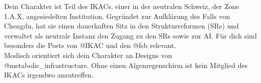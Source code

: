 Dein Charakter ist Teil des IKACs, einer in der neutralen Schweiz, der Zone
1.A.X, angesiedelten Institution. Gegründet zur Aufklärung des Falls von Chengdu,
hat sie einen dauerhaften Sitz in den Strukturreformen (SRs) und verwaltet als
neutrale Instanz den Zugang zu den SRs sowie zur AI. Für dich sind besonders die
Posts von @IKAC und den @fsb relevant.\\ 
Modisch orientiert sich dein Charakter an Designs von
@metabolic\_infrastructure. Ohne einen Algenregenschirm ist kein Mitglied des
IKACs irgendwo anzutreffen. 
